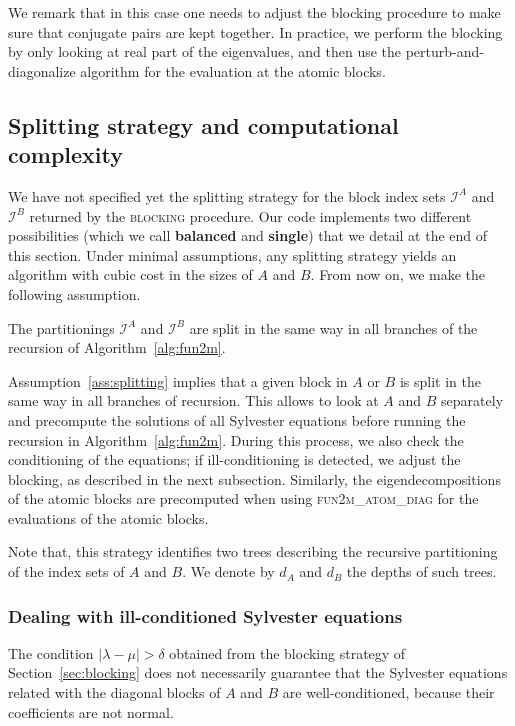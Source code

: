 \documentclass{siamart1116}
\begin{document}
We remark that in this case one needs to adjust the blocking 
procedure to make sure that conjugate pairs are kept together. In practice, we perform the blocking by only 
looking at real part of the eigenvalues, and then use the 
perturb-and-diagonalize algorithm for the evaluation at the
atomic blocks. 

\subsection{Splitting strategy and computational complexity}\label{sec:splitting}
We have not specified yet the splitting strategy for the
block index sets $\mathcal I^A$ and $\mathcal I^B$ returned
by the \textsc{blocking} procedure. Our code implements two
different possibilities (which we call \textbf{balanced} and 
\textbf{single}) that we detail at the end of this section. 
Under minimal assumptions, any splitting
strategy yields an algorithm with cubic cost in the sizes 
of $A$ and $B$. 
From now on, we make the following assumption. 

\begin{assumption}\label{ass:splitting}
The partitionings $\mathcal I^A$ and $\mathcal I^B$
are split in the same way in all branches of the recursion
of Algorithm~\ref{alg:fun2m}.
\end{assumption}  
Assumption~\ref{ass:splitting} implies that a given block in $A$ or $B$
is split in the same way in all branches of recursion. This allows to look at $A$ and $B$ separately and precompute the solutions of all Sylvester equations before running the recursion in Algorithm~\ref{alg:fun2m}. During this process,
we also check the conditioning of the equations; if ill-conditioning 
is detected, we adjust the blocking, as described in the next subsection.
Similarly, the eigendecompositions of the atomic blocks
are precomputed when using \textsc{fun2m\_atom\_diag} for the evaluations
of the atomic blocks. 

Note that, this strategy identifies two trees describing the recursive partitioning of the index sets of $A$ and $B$. We denote by $d_A$ and $d_B$ the depths of such trees.

\subsubsection{Dealing with ill-conditioned Sylvester equations}

The condition $|\lambda - \mu| > \delta$ obtained from 
the blocking strategy of Section~\ref{sec:blocking} does not
necessarily guarantee that the Sylvester equations
related with the diagonal blocks of 
$A$ and $B$ are well-conditioned, because their
coefficients are not normal.
\end{document}
